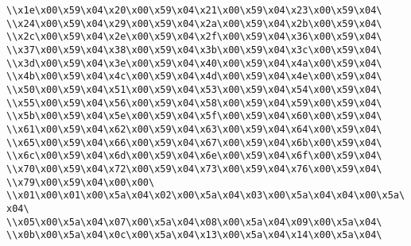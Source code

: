 \verb|\\x1e\x00\x59\x04\x20\x00\x59\x04\x21\x00\x59\x04\x23\x00\x59\x04\|\newline
\verb|\\x24\x00\x59\x04\x29\x00\x59\x04\x2a\x00\x59\x04\x2b\x00\x59\x04\|\newline
\verb|\\x2c\x00\x59\x04\x2e\x00\x59\x04\x2f\x00\x59\x04\x36\x00\x59\x04\|\newline
\verb|\\x37\x00\x59\x04\x38\x00\x59\x04\x3b\x00\x59\x04\x3c\x00\x59\x04\|\newline
\verb|\\x3d\x00\x59\x04\x3e\x00\x59\x04\x40\x00\x59\x04\x4a\x00\x59\x04\|\newline
\verb|\\x4b\x00\x59\x04\x4c\x00\x59\x04\x4d\x00\x59\x04\x4e\x00\x59\x04\|\newline
\verb|\\x50\x00\x59\x04\x51\x00\x59\x04\x53\x00\x59\x04\x54\x00\x59\x04\|\newline
\verb|\\x55\x00\x59\x04\x56\x00\x59\x04\x58\x00\x59\x04\x59\x00\x59\x04\|\newline
\verb|\\x5b\x00\x59\x04\x5e\x00\x59\x04\x5f\x00\x59\x04\x60\x00\x59\x04\|\newline
\verb|\\x61\x00\x59\x04\x62\x00\x59\x04\x63\x00\x59\x04\x64\x00\x59\x04\|\newline
\verb|\\x65\x00\x59\x04\x66\x00\x59\x04\x67\x00\x59\x04\x6b\x00\x59\x04\|\newline
\verb|\\x6c\x00\x59\x04\x6d\x00\x59\x04\x6e\x00\x59\x04\x6f\x00\x59\x04\|\newline
\verb|\\x70\x00\x59\x04\x72\x00\x59\x04\x73\x00\x59\x04\x76\x00\x59\x04\|\newline
\verb|\\x79\x00\x59\x04\x00\x00\|\newline
\verb|\\x01\x00\x01\x00\x5a\x04\x02\x00\x5a\x04\x03\x00\x5a\x04\x04\x00\x5a\x04\|\newline
\verb|\\x05\x00\x5a\x04\x07\x00\x5a\x04\x08\x00\x5a\x04\x09\x00\x5a\x04\|\newline
\verb|\\x0b\x00\x5a\x04\x0c\x00\x5a\x04\x13\x00\x5a\x04\x14\x00\x5a\x04\|\newline
